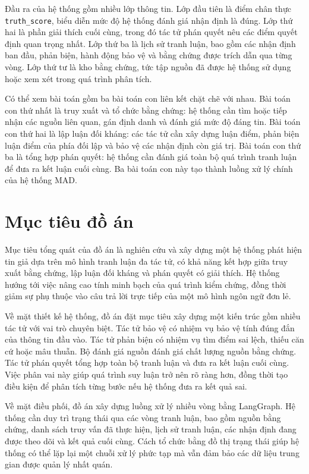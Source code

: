 ﻿\documentclass[oneside,a4paper,12pt]{extreport}
\begin{document}
Đầu ra của hệ thống gồm nhiều lớp thông tin. Lớp đầu tiên là điểm chân thực \texttt{truth\_score}, biểu diễn mức độ hệ thống đánh giá nhận định là đúng. Lớp thứ hai là phần giải thích cuối cùng, trong đó tác tử phán quyết nêu các điểm quyết định quan trọng nhất. Lớp thứ ba là lịch sử tranh luận, bao gồm các nhận định ban đầu, phản biện, hành động bảo vệ và bằng chứng được trích dẫn qua từng vòng. Lớp thứ tư là kho bằng chứng, tức tập nguồn đã được hệ thống sử dụng hoặc xem xét trong quá trình phân tích.

Có thể xem bài toán gồm ba bài toán con liên kết chặt chẽ với nhau. Bài toán con thứ nhất là truy xuất và tổ chức bằng chứng: hệ thống cần tìm hoặc tiếp nhận các nguồn liên quan, gán định danh và đánh giá mức độ đáng tin. Bài toán con thứ hai là lập luận đối kháng: các tác tử cần xây dựng luận điểm, phản biện luận điểm của phía đối lập và bảo vệ các nhận định còn giá trị. Bài toán con thứ ba là tổng hợp phán quyết: hệ thống cần đánh giá toàn bộ quá trình tranh luận để đưa ra kết luận cuối cùng. Ba bài toán con này tạo thành luồng xử lý chính của hệ thống MAD.

\section{Mục tiêu đồ án}

Mục tiêu tổng quát của đồ án là nghiên cứu và xây dựng một hệ thống phát hiện tin giả dựa trên mô hình tranh luận đa tác tử, có khả năng kết hợp giữa truy xuất bằng chứng, lập luận đối kháng và phán quyết có giải thích. Hệ thống hướng tới việc nâng cao tính minh bạch của quá trình kiểm chứng, đồng thời giảm sự phụ thuộc vào câu trả lời trực tiếp của một mô hình ngôn ngữ đơn lẻ.

Về mặt thiết kế hệ thống, đồ án đặt mục tiêu xây dựng một kiến trúc gồm nhiều tác tử với vai trò chuyên biệt. Tác tử bảo vệ có nhiệm vụ bảo vệ tính đúng đắn của thông tin đầu vào. Tác tử phản biện có nhiệm vụ tìm điểm sai lệch, thiếu căn cứ hoặc mâu thuẫn. Bộ đánh giá nguồn đánh giá chất lượng nguồn bằng chứng. Tác tử phán quyết tổng hợp toàn bộ tranh luận và đưa ra kết luận cuối cùng. Việc phân vai này giúp quá trình suy luận trở nên rõ ràng hơn, đồng thời tạo điều kiện để phân tích từng bước nếu hệ thống đưa ra kết quả sai.

Về mặt điều phối, đồ án xây dựng luồng xử lý nhiều vòng bằng LangGraph. Hệ thống cần duy trì trạng thái qua các vòng tranh luận, bao gồm nguồn bằng chứng, danh sách truy vấn đã thực hiện, lịch sử tranh luận, các nhận định đang được theo dõi và kết quả cuối cùng. Cách tổ chức bằng đồ thị trạng thái giúp hệ thống có thể lặp lại một chuỗi xử lý phức tạp mà vẫn đảm bảo các dữ liệu trung gian được quản lý nhất quán.
\end{document}

